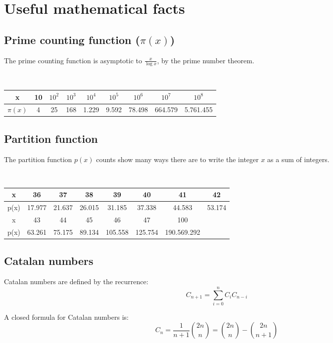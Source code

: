 \documentclass[a4paper]{amsart}
\begin{document}
  \section{Useful mathematical facts}
  \begin{multicols}{2}
    \subsection{Prime counting function ($\pi(x)$)} The prime counting function is asymptotic to $\frac{x}{\log x}$, by the prime number theorem.

      \ 

      \begin{tabular}{|c|c|c|c|c|c|c|c|c|}
        \hline 
          x&10&$10^2$&$10^3$&$10^4$&$10^5$&$10^6$&$10^7$&$10^8$\\ \hline
          $\pi(x)$&4&25&168&1.229&9.592&78.498&664.579&5.761.455\\ \hline
      \end{tabular}

    \subsection{Partition function} The partition function $p(x)$ counts show many ways there are to write the integer $x$ as a sum of integers.

      \

      \begin{tabular}{|c|c|c|c|c|c|c|c|}
        \hline
        x&36&37&38&39&40&41&42 \\ \hline
        p(x)&17.977&21.637&26.015&31.185&37.338&44.583&53.174 \\ \hline\hline
        x&43&44&45&46&47&100& \\ \hline
        p(x)&63.261&75.175&89.134&105.558&125.754&190.569.292& \\ \hline
      \end{tabular}

    \subsection{Catalan numbers} Catalan numbers are defined by the recurrence:
      \begin{equation*}
        C_{n+1} = \sum_{i=0}^nC_iC_{n-i}
      \end{equation*}

      A closed formula for Catalan numbers is:
      \begin{equation*}
        C_n = \frac{1}{n+1}\binom{2n}{n} = \binom{2n}{n} - \binom{2n}{n+1}
      \end{equation*}


\end{multicols}
\end{document}
